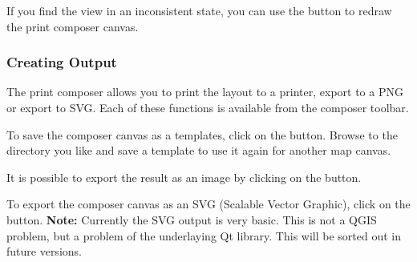 If you find the view in an inconsistent state, you can use the  button
to redraw the print composer canvas.

\subsubsection{Creating Output}

The print composer allows you to print the layout to a printer, export to a PNG or
export to SVG. Each of these functions is available from the composer toolbar.

To save the composer canvas as a templates, click on the
button. Browse to the directory 
you like and save a template to use it again for another map canvas.

It is possible to export the result as an image by clicking on the
button. 

To export the composer canvas as an  SVG (Scalable Vector Graphic), click on
the 
button. \textbf{Note:}
Currently the SVG output is very basic. This is not a QGIS problem, but a
problem of the underlaying Qt library. This will be sorted out in future versions.
 
